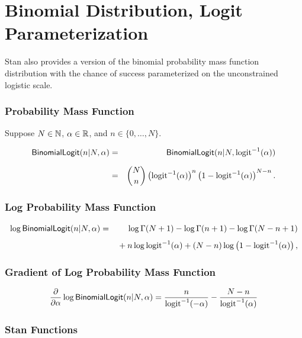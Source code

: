 \section{Binomial Distribution, Logit Parameterization}

Stan also provides a version of the binomial probability mass function
distribution with the chance of success parameterized on the
unconstrained logistic scale.  

\subsubsection{Probability Mass Function}

Suppose $N \in \nats$, $\alpha \in \reals$, and $n \in
\{0,\ldots,N\}$.

\begin{eqnarray*}
\distro{BinomialLogit}(n|N,\alpha)
& = & \distro{BinomialLogit}(n|N,\mbox{logit}^{-1}(\alpha))
\\[6pt]
& = & \binom{N}{n} \left( \mbox{logit}^{-1}(\alpha) \right)^{n}
                    \left( 1 - \mbox{logit}^{-1}(\alpha) \right)^{N - n}.
\end{eqnarray*}


\subsubsection{Log Probability Mass Function}

\begin{eqnarray*}
\log \distro{BinomialLogit}(n|N,\alpha)
& = &
\log \Gamma(N+1) - \log \Gamma(n + 1) - \log \Gamma(N- n + 1)
\\[4pt]
& & { } + n \log \mbox{logit}^{-1}(\alpha) + (N - n) \log \left( 1 -
  \mbox{logit}^{-1}(\alpha) \right), 
\end{eqnarray*}


\subsubsection{Gradient of Log Probability Mass Function}

\[
\frac{\partial}{\partial \alpha} \log \distro{BinomialLogit}(n|N,\alpha)
= \frac{n}{\mbox{logit}^{-1}(-\alpha)}
- \frac{N - n}{\mbox{logit}^{-1}(\alpha)}
\]


\subsubsection{Stan Functions}

